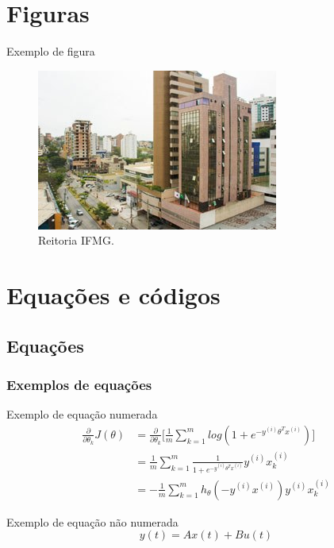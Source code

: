 \documentclass[table,xcolor=table]{apresentações/exemplo 2/IFMG-beamer}
\begin{document}
\section{Figuras}

\begin{frame}{Exemplo de figura} 

\begin{figure}
\centering
\caption{Reitoria IFMG.}
\includegraphics[width=0.8\linewidth]{figs/reitoria.jpeg}

\end{figure}

\end{frame}

\section{Equações e códigos}
\subsection{Equações}
\begin{frame}
\frametitle{Exemplos de equações}


\begin{block}{Exemplo de equação numerada}
\begin{align}
    \frac{\partial}{\partial \theta_k}J(\theta) 
        &= \frac{\partial}{\partial \theta_k}\Bigg[\frac{1}{m}\sum_{k=1}^m log(1+e^{-y^{(i)}\theta^Tx^{(i)}})\Bigg] \\
        &= \frac{1}{m}\sum_{k=1}^m \frac{1}{1+e^{-y^{(i)}\theta^Tx^{(i)}}}y^{(i)}x_k^{(i)} \\
        &= -\frac{1}{m}\sum_{k=1}^m h_\theta(-y^{(i)}x^{(i)})y^{(i)}x_k^{(i)}        
\end{align}
\end{block}
\begin{block}{Exemplo de equação não numerada}
    \begin{equation*}
        y(t) = Ax(t) + Bu(t)
    \end{equation*}
\end{block}

\end{frame}
\end{document}
